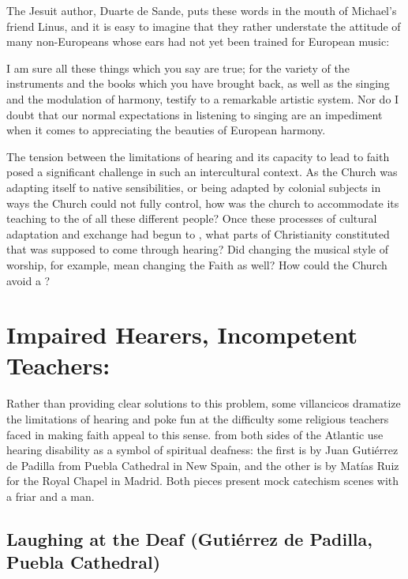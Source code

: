 The Jesuit author, Duarte de Sande, puts these words in the mouth of Michael's
friend Linus, and it is easy to imagine that they rather understate the attitude
of many non-Europeans whose ears had not yet been trained for European music:
\begin{quoting}
    I am sure all these things which you say are true; for the variety of the
    instruments and the books which you have brought back, as well as the
    singing and the modulation of harmony, testify to a remarkable artistic
    system.
    Nor do I doubt that our normal expectations in listening to singing are an
    impediment when it comes to appreciating the beauties of European harmony.%
        \Autocite[156]{Massarella:JapaneseTravellers}
\end{quoting}

The tension between the limitations of hearing and its capacity to lead to
faith posed a significant challenge in such an intercultural context.
As the Church was adapting itself to native sensibilities, or being adapted by
colonial subjects in ways the Church could not fully control, how was the church
to accommodate its teaching to the  of all these
different people?
Once these processes of cultural adaptation and exchange had begun to
, what parts of Christianity constituted  that
was supposed to come through hearing?
Did changing the musical style of worship, for example, mean changing the Faith
as well?
How could the Church avoid a ?

\section{Impaired Hearers, Incompetent Teachers: 
}

Rather than providing clear solutions to this problem, some villancicos
dramatize the limitations of hearing and poke fun at the difficulty some
religious teachers faced in making faith appeal to this sense.
 from both sides of the Atlantic use hearing
disability as a symbol of spiritual deafness: the first is by Juan Gutiérrez de
Padilla from Puebla Cathedral in New Spain, and the other is by Matías Ruiz for
the Royal Chapel in Madrid.
Both pieces present mock catechism scenes with a friar and a  man.

\subsection{Laughing at the Deaf (Gutiérrez de Padilla, Puebla Cathedral)}

